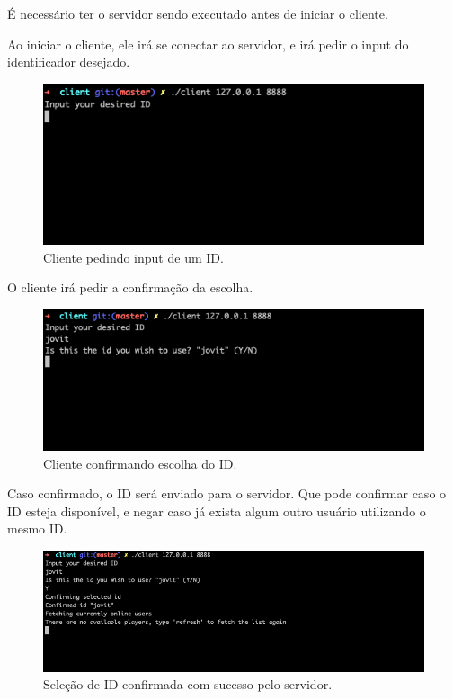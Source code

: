 \documentclass[12pt,a4paper]{report}
\begin{document}
\bigbreak

É necessário ter o servidor sendo executado antes de iniciar o cliente.

\bigbreak

Ao iniciar o cliente, ele irá se conectar ao servidor, e irá pedir o input do identificador desejado.

\begin{figure}[H]
    \includegraphics[width=\linewidth]{id_input.png}
    \caption{Cliente pedindo input de um ID.}
\end{figure}

O cliente irá pedir a confirmação da escolha. 

\begin{figure}[H]
    \includegraphics[width=\linewidth]{id_input_conf.png}
    \caption{Cliente confirmando escolha do ID.}
\end{figure}

Caso confirmado, o ID será enviado para o servidor. Que pode confirmar caso o ID esteja disponível, e negar caso já exista algum outro usuário utilizando o mesmo ID.

\begin{figure}[H]
    \includegraphics[width=\linewidth]{id_input_success.png}
    \caption{Seleção de ID confirmada com sucesso pelo servidor.}
\end{figure}
\end{document}
